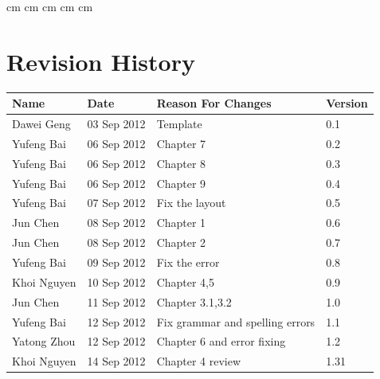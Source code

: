 \documentclass[11pt, a4paper]{report}
\begin{document}
 cm
 cm
 cm
 cm
 cm

\tableofcontents






\clearpage
\section*{Revision History}
\begin{tabular}{| l | l | l | l | }
\hline
Name				  &	Date        	&	Reason For Changes                  	  	&	Version     	\\ \hline
Dawei Geng		&	03 Sep 2012   &	Template			                    	      &	0.1 	    	  \\ \hline
Yufeng Bai		&	06 Sep 2012	  &	Chapter 7							                    &	0.2		        \\ \hline
Yufeng Bai		&	06 Sep 2012	  &	Chapter 8							                    &	0.3		        \\ \hline
Yufeng Bai		&	06 Sep 2012	  &	Chapter 9							                    &	0.4		        \\ \hline
Yufeng Bai		&	07 Sep 2012	  &	Fix the layout						                &	0.5		        \\ \hline
Jun Chen    	& 08 Sep 2012 	&	Chapter 1                  		  	        &	0.6     	    \\ \hline
Jun Chen   		&	08 Sep 2012 	&	Chapter 2                 	  			      &	0.7           \\ \hline
Yufeng Bai		&	09 Sep 2012	  &	Fix the error						                  &	0.8		        \\ \hline
Khoi Nguyen 	&	10 Sep 2012   &	Chapter 4,5             				          &	0.9     	    \\ \hline
Jun Chen			&	11 Sep 2012	  &	Chapter 3.1,3.2                	  		    &	1.0    	      \\ \hline
Yufeng Bai		&	12 Sep 2012	  &	Fix grammar and spelling errors			      &	1.1		        \\ \hline
Yatong Zhou   &	12 Sep 2012   &	Chapter 6 and error fixing				        &	1.2     	    \\ \hline
Khoi Nguyen   &	14 Sep 2012   &	Chapter 4 review                          &	1.31          \\ \hline

\end{tabular}
\end{document}
